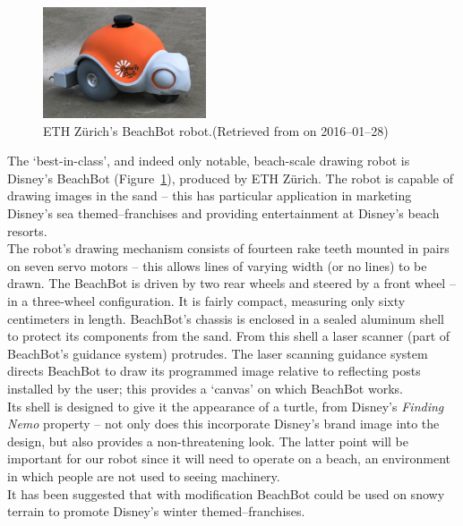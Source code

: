     \label{sand-drawing robots}
        \begin{figure}
          \begin{center}
            \includegraphics[width=0.43\textwidth]{Files/beachbot}
          \end{center}
          \caption{ETH Z{\"u}rich's BeachBot robot.{\small (Retrieved from  on 2016--01--28)}}
          \label{fig: beachbot}
        \end{figure}
        The `best-in-class', and indeed only notable, beach-scale drawing robot is Disney's BeachBot (Figure~\ref{fig: beachbot}), produced by ETH Z{\"u}rich.\cite{beachbot} The robot is capable of drawing images in the sand -- this has particular application in marketing Disney's sea themed--franchises and providing entertainment at Disney's beach resorts.\\
        The robot's drawing mechanism consists of fourteen rake teeth mounted in pairs on seven \gls{servo} motors -- this allows lines of varying width (or no lines) to be drawn. The BeachBot is driven by two rear wheels and steered by a front wheel -- in a three-wheel configuration. It is fairly compact, measuring only sixty centimeters in length. BeachBot's chassis is enclosed in a sealed aluminum shell to protect its components from the sand. From this shell a laser scanner (part of BeachBot's guidance system) protrudes. The laser scanning guidance system directs BeachBot to draw its programmed image relative to reflecting posts installed by the user; this provides a `canvas' on which BeachBot works.\\
        Its shell is designed to give it the appearance of a turtle, from Disney's \emph{Finding Nemo} property -- not only does this incorporate Disney's brand image into the design, but also provides a non-threatening look. The latter point will be important for our robot since it will need to operate on a beach, an environment in which people are not used to seeing machinery.\\
        It has been suggested that with modification BeachBot could be used on snowy terrain to promote Disney's winter themed--franchises.

